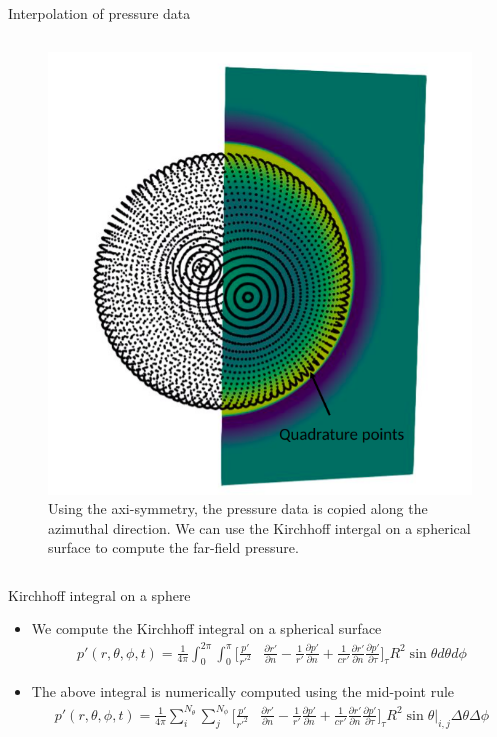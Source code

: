 \documentclass[10pt, aspectratio=169]{beamer}
\begin{document}
\begin{frame}{Interpolation of pressure data}
\begin{columns}
\begin{figure}
			\includegraphics[scale=0.21]{images/sphere.png}
			\caption{Using the axi-symmetry, the pressure data is copied along the azimuthal direction. We can use the Kirchhoff intergal on a spherical surface to compute the far-field pressure.}
		\end{figure}
	\end{columns}
\end{frame}

\begin{frame}{Kirchhoff integral on a sphere}
	\begin{itemize}
		\item We compute the Kirchhoff integral on a spherical surface 
		\begin{equation}
			\begin{split}
				p'(r, \theta, \phi,t) =  \frac{1}{4\pi}\int_{0}^{2\pi}\int_{0}^{\pi}\Big[  \frac{p'}{r'^{2}}&\frac{\partial r'}{\partial n} - \frac{1}{r'}\frac{\partial p'}{\partial n} + \frac{1}{c r'}\frac{\partial r'}{\partial n}\frac{\partial p'}{\partial \tau} \Big]_{\tau} R^2\sin\theta d\theta d \phi  
			\end{split} 
		\end{equation}
		\item The above integral is numerically computed using the mid-point rule 
		\begin{equation}
			\begin{split}
				p'(r, \theta, \phi,t) =  \frac{1}{4\pi} \sum_{i}^{N_{\theta}}\sum_{j}^{N_{\phi}}  \Big[  \frac{p'}{r'^{2}}&\frac{\partial r'}{\partial n} - \frac{1}{r'}\frac{\partial p'}{\partial n} + \frac{1}{c r'}\frac{\partial r'}{\partial n}\frac{\partial p'}{\partial \tau} \Big]_{\tau} R^2\sin\theta \Big|_{i, j} \Delta \theta \Delta \phi  
			\end{split} 
		\end{equation}
	\end{itemize}
\end{frame}
\end{document}
